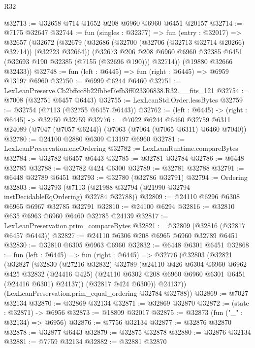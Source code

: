\begin{lexlean}{R32}
\begin{coremodule}
@32713 := @32658 @714 @1652 @208 @6960 @6960 @6451 @20157
@32714 := @7175 @32647
@32744 := fun (singles : @32377) =>
  fun (entry : @32017) =>
  @32657
    (@32672
      (@32679
        (@32686 (@32700 (@32706 (@32713 @32714 @20266) @32714)) (@32223 @32664))
        (@32673
          @206
          @208
          @6960
          @6960
          @32385
          @6451
          (@32693 @190 @32385 (@7155 (@32696 @190)))
          @32714))
      (@19880 @32666 @32433))
@32748 := fun (left : @6445) => fun (right : @6445) => @6959 @13197 @6960
@32750 := @6999 @6244 @6460
@32751 := LexLeanPreserve.Cb2bffcc8b22fbbef7efb3ff023306838.R32.__fits_121
@32754 := @7008 (@32751 @6457 @6443)
@32755 := LexLeanStd.Order.lessBytes
@32759 := @32754 (@7113 (@32755 @6457 @6443))
@32762 := (left : @6445) -> (right : @6445) -> @32750 @32759
@32776 := @7022
    @6244
    @6460
    @32759
    @6311
    @24089
    (@7047 (@7057 @6244))
    (@7063 (@7064 (@7065 @6311) @6460 @7040))
@32780 := @24100 @2880 @6309 @13197 @6960
@32781 := LexLeanPreservation.encOrdering
@32782 := LexLeanRuntime.compareBytes
@32784 := @32782 @6457 @6443
@32785 := @32781 @32784
@32786 := @6448 @32785
@32788 := @32782 @424 @6300
@32789 := @32781 @32788
@32791 := @6448 @32789 @6451
@32793 := @32780 (@32786 @32791)
@32794 := Ordering
@32803 := @32793 (@7113 (@21988 @32794 (@21990 @32794 instDecidableEqOrdering) @32784 @32788))
@32809 := @24110 @6296 @6308 @6965 @6967 @32785 @32791
@32810 := @24100 @6294
@32816 := @32810 @635 @6963 @6960 @6460 @32785 @24139
@32817 := LexLeanPreservation.prim_compareBytes
@32821 := @32809 (@32816 (@32817 @6457 @6443))
@32827 := @24110 @6306 @208 @6965 @6960 @32789 @6451
@32830 := @32810 @6305 @6963 @6960
@32832 := @6448 @6301 @6451
@32868 := fun (left : @6445) =>
  fun (right : @6445) =>
  @32776
    (@32803
      (@32821
        (@32827
          (@32830
            (@27216 @32832)
            @32789
            (@24110
              @426
              @6304
              @6960
              @6962
              @425
              @32832
              (@24416 @425)
              (@24110 @6302 @208 @6960 @6960 @6301 @6451 (@24416 @6301) @24137))
            (@32817 @424 @6300))
          @24137))
      (LexLeanPreservation.prim_equal_ordering @32784 @32788))
@32869 := @7027 @32134
@32870 := @32869 @32134
@32871 := @32869 @32870
@32872 := (state : @32871) -> @6956
@32873 := @18809 @32017
@32875 := @32873 (fun ("_" : @32134) => @6956)
@32876 := @7756 @32134
@32877 := @32876 @32870
@32878 := @32877 @6443
@32879 := @32875 @32878
@32880 := @32876 @32134
@32881 := @7759 @32134
@32882 := @32881 @32870

\end{coremodule}
\end{lexlean}

